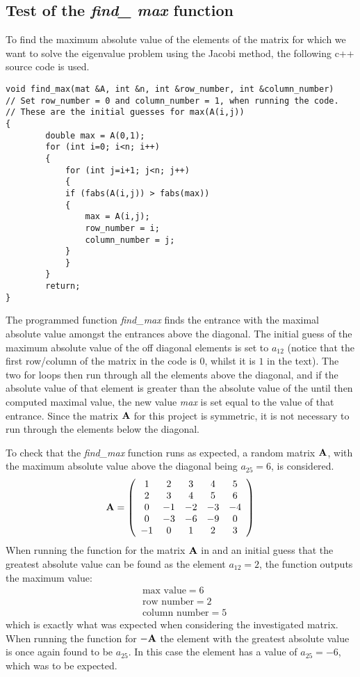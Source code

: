 \subsection{Test of the \textit{find\_ max} function}
\label{subsec:test_find_max}
To find the maximum absolute value of the elements of the matrix for which we want to solve the eigenvalue problem using the Jacobi method, the following c++ source code is used.
\begin{lstlisting}
void find_max(mat &A, int &n, int &row_number, int &column_number)
// Set row_number = 0 and column_number = 1, when running the code. 
// These are the initial guesses for max(A(i,j))
{
        double max = A(0,1);
        for (int i=0; i<n; i++)
        {
            for (int j=i+1; j<n; j++)
            {
            if (fabs(A(i,j)) > fabs(max))
            {
                max = A(i,j);
                row_number = i;
                column_number = j;
            }
            }
        }
        return;
}
\end{lstlisting}
The programmed function \textit{find\_max} finds the entrance with the maximal absolute value amongst the entrances above the diagonal. 
The initial guess of the maximum absolute value of the off diagonal elements is set to $a_{12}$ (notice that the first row/column of the matrix in the code is $0$, whilst it is $1$ in the text).
The two for loops then run through all the elements above the diagonal, and if the absolute value of that element is greater than the absolute value of the until then computed maximal value, the new value \textit{max} is set equal to the value of that entrance.
Since the matrix $\mbox{\textbf{A}}$ for this project is symmetric, it is not necessary to run through the elements below the diagonal.

To check that the \textit{find\_max} function runs as expected, a random matrix $\mbox{\textbf{A}}$, with the maximum absolute value above the diagonal being $a_{25} = 6$, is considered.
\begin{align}
	\mbox{\textbf{A}} =
	\left(
	\begin{array}{ccccc}
	1 & 2 & 3 & 4 & 5
	\\
	2 & 3 & 4 & 5 & 6
	\\
	0 & -1 & -2 & -3 & -4
	\\
	0 & -3 & -6 & -9 & 0
	\\
	-1 & 0 & 1 & 2 & 3
	\end{array}
	\right)
	\label{eq:test_find_max1}
\end{align}
When running the function for the matrix $\mbox{\textbf{A}}$ in  and an initial guess that the greatest absolute value can be found as the element $a_{12} = 2$, the function outputs the maximum value:
\begin{align*}
	&\text{max value} = 6
	\\
	&\text{row number} = 2
	\\
	&\text{column number} = 5
\end{align*}
which is exactly what was expected when considering the investigated matrix.
When running the function for $-\mbox{\textbf{A}}$ the element with the greatest absolute value is once again found to be $a_{25}$.
In this case the element has a value of $a_{25} = -6 $, which was to be expected.
